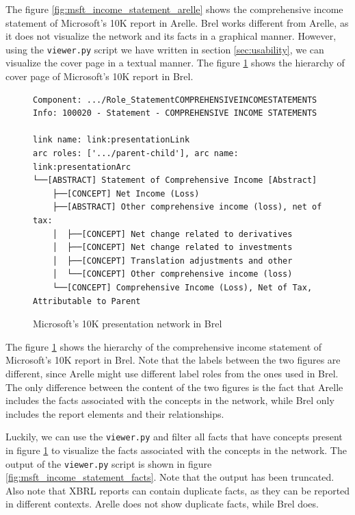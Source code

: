 The figure \ref{fig:msft_income_statement_arelle} shows the comprehensive income statement of Microsoft's 10K report in Arelle.
Brel works different from Arelle, as it does not visualize the network and its facts in a graphical manner.
However, using the \texttt{viewer.py} script we have written in section \ref{sec:usability}, 
we can visualize the cover page in a textual manner.
The figure \ref{fig:msft_income_statement_network} shows the hierarchy of cover page of Microsoft's 10K report in Brel.

\begin{figure}[H]
    \begin{lstlisting}[basicstyle=\small\ttfamily]
Component: .../Role_StatementCOMPREHENSIVEINCOMESTATEMENTS
Info: 100020 - Statement - COMPREHENSIVE INCOME STATEMENTS

link name: link:presentationLink
arc roles: ['.../parent-child'], arc name: link:presentationArc
└──[ABSTRACT] Statement of Comprehensive Income [Abstract]
    ├──[CONCEPT] Net Income (Loss)
    ├──[ABSTRACT] Other comprehensive income (loss), net of tax:
    │  ├──[CONCEPT] Net change related to derivatives
    │  ├──[CONCEPT] Net change related to investments
    │  ├──[CONCEPT] Translation adjustments and other
    │  └──[CONCEPT] Other comprehensive income (loss)
    └──[CONCEPT] Comprehensive Income (Loss), Net of Tax, Attributable to Parent
    \end{lstlisting}
    \caption{Microsoft's 10K presentation network in Brel}
    \label{fig:msft_income_statement_network}
\end{figure}

The figure \ref{fig:msft_income_statement_network} shows the hierarchy of the comprehensive income statement of Microsoft's 10K report in Brel.
Note that the labels between the two figures are different, since Arelle might use different label roles from the ones used in Brel.
The only difference between the content of the two figures is the fact that Arelle includes the facts associated with the concepts in the network, 
while Brel only includes the report elements and their relationships.

Luckily, we can use the \texttt{viewer.py} and filter all facts that have concepts present in figure \ref{fig:msft_income_statement_network}
to visualize the facts associated with the concepts in the network.
The output of the \texttt{viewer.py} script is shown in figure \ref{fig:msft_income_statement_facts}.
Note that the output has been truncated.
Also note that XBRL reports can contain duplicate facts, as they can be reported in different contexts.
Arelle does not show duplicate facts, while Brel does.

